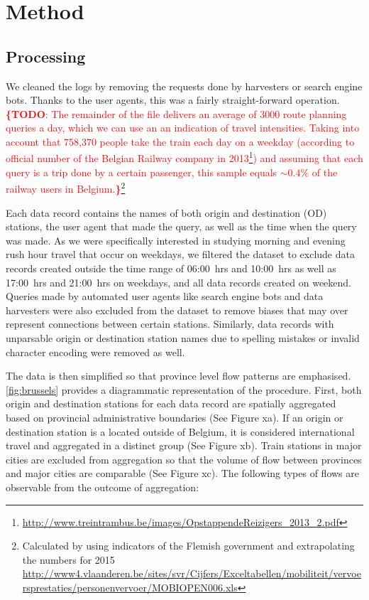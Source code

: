 \documentclass{sig-alternate}
\newcommand{\todo}[1]{\noindent\textcolor{red}{{\bf \{TODO}: #1{\bf \}}}}
\begin{document}
\section{Method}
\label{sec:method}


\subsection{Processing}

We cleaned the logs by removing the requests done by harvesters or search engine bots.
Thanks to the user agents, this was a fairly straight-forward operation.
\todo{The remainder of the file delivers an average of 3000 route planning queries a day, which we can use an an indication of travel intensities.
Taking into account that 758,370 people take the train each day on a weekday (according to official number of the Belgian Railway company in 2013\footnote{\url{http://www.treintrambus.be/images/OpstappendeReizigers_2013_2.pdf}}) and assuming that each query is a trip done by a certain passenger, this sample equals $\sim0.4\%$ of the railway users in Belgium.}\footnote{Calculated by using indicators of the Flemish government and extrapolating the numbers for 2015 \url{http://www4.vlaanderen.be/sites/svr/Cijfers/Exceltabellen/mobiliteit/vervoersprestaties/personenvervoer/MOBIOPEN006.xls}}

Each data record contains the names of both origin and destination (OD) stations, the user agent that made the query, as well as the time when the query was made.
As we were specifically interested in studying morning and evening rush hour travel that occur on weekdays, we filtered the dataset to exclude data records created outside the time range of 06:00~hrs and 10:00~hrs as well as 17:00~hrs and 21:00~hrs on weekdays, and all data records created on weekend. Queries made by automated user agents like search engine bots and data harvesters were also excluded from the dataset to remove biases that may over represent connections between certain stations. Similarly, data records with unparsable origin or destination station names due to spelling mistakes or invalid character encoding were removed as well.

The data is then simplified so that province level flow patterns are emphasised.
\cref{fig:brussels} provides a diagrammatic representation of the procedure.
First, both origin and destination stations for each data record are spatially aggregated based on provincial administrative boundaries (See Figure xa).
If an origin or destination station is a located outside of Belgium, it is considered international travel and aggregated in a distinct group (See Figure xb).
Train stations in major cities are excluded from aggregation so that the volume of flow between provinces and major cities are comparable (See Figure xc).
The following types of flows are observable from the outcome of aggregation:
\end{document}
